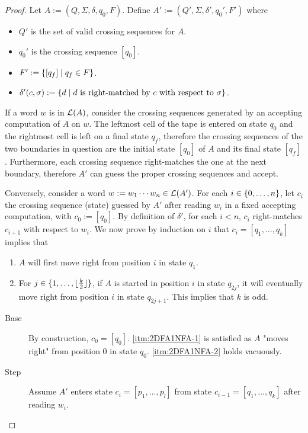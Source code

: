 \begin{proof}
	Let $A:=(Q,\Sigma,\delta,q_0,F)$. Define $A':=(Q',\Sigma,\delta',q_0',F')$ where
	\begin{itemize}
		\item $Q'$ is the set of valid crossing sequences for $A$.
		\item $q_0'$ is the crossing sequence $[q_0]$.
		\item $F':=\{[q_f] \mid q_f\in F\}$.
		\item $\delta'(c,\sigma):=\{d \mid \text{$d$ is right-matched by $c$ with respect to $\sigma$}\}$.
	\end{itemize}

	If a word $w$ is in $\mathcal L(A)$, consider the crossing sequences generated by an accepting computation of $A$ on $w$.
	The leftmost cell of the tape is entered on state $q_0$ and the rightmost cell is left on a final state $q_f$, therefore the crossing sequences of the two boundaries in question are the initial state $[q_0]$ of $A$ and its final state $[q_f]$.
	Furthermore, each crossing sequence right-matches the one at the next boundary, therefore $A'$ can guess the proper crossing sequences and accept.

	Conversely, consider a word $w:=w_1\cdots w_n\in\mathcal L(A')$.
	For each $i\in\{0,\dots,n\}$, let $c_i$ the crossing sequence (state) guessed by $A'$ after reading $w_i$ in a fixed accepting computation, with $c_0:=[q_0]$.
	By definition of $\delta'$, for each $i<n$, $c_i$ right-matches $c_{i+1}$ with respect to $w_i$.
	We now prove by induction on $i$ that $c_i=[q_1,\dots,q_k]$ implies that
	\begin{enumerate}[(1)]
		\item \label{itm:2DFA1NFA-1} $A$ will first move right from position $i$ in state $q_1$.
		\item \label{itm:2DFA1NFA-2} For $j\in\{1,\dots,\lfloor \frac{k}{2} \rfloor\}$, if $A$ is started in position $i$ in state $q_{2j}$, it will eventually move right from position $i$ in state $q_{2j+1}$. This implies that $k$ is odd.
	\end{enumerate}

	\begin{description}
		\item[Base] By construction, $c_0=[q_0]$. \ref{itm:2DFA1NFA-1} is satisfied as $A$ "moves right" from position $0$ in state $q_0$. \ref{itm:2DFA1NFA-2} holds vacuously.
		\item[Step] Assume $A'$ enters state $c_i=[p_1,\dots,p_l]$ from state $c_{i-1}=[q_1,\dots,q_k]$ after reading $w_i$.
	\end{description}


\end{proof}
